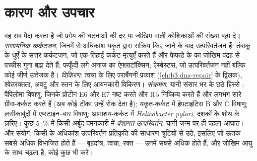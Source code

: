 \section{कारण और उपचार}

\begin{proposition}[कारण]\label{prop:b3:cancer-biology:causes}
 वह सब पैदा करता है जो प्रमेय की घटनाओं की दर या जोखिम वाली
कोशिकाओं की संख्या बढ़ा दे। \emph{रासायनिक कर्कटजन}, जिनमें से अधिकांश
यकृत द्वारा सक्रिय किए जाने के बाद उत्परिवर्तजन हैं: तंबाकू के धुएँ के
सत्तर कर्कटजन, जो एक-तिहाई कर्कट-मृत्युएँ करते हैं और फेफड़े के 
का जोखिम पंद्रह से पच्चीस गुना बढ़ा देते हैं; फफूँदी लगे अनाज का
ऐफ़्लाटॉक्सिन; ऐस्बेस्टस, जो उत्परिवर्तजन नहीं बल्कि कोई जीर्ण उत्तेजक
है। \emph{विकिरण}: त्वचा के लिए पराबैंगनी प्रकाश
(\cref{ch:b3:dna-repair} के द्विलक), श्वेतरक्तता, अवटु
और स्तन के लिए आयनकारी विकिरण। \emph{संक्रमण}, यानी संसार भर के छठे
हिस्से : पैपिलोमा विषाणु, जिनके प्रोटीन E6 और E7  नष्ट करते और
Rb निष्क्रिय करते हैं और लगभग सारे ग्रीवा-कर्कट करते हैं (अब कोई टीका
उन्हें रोक देता है); यकृत-कर्कट में हेपटाइटिस B और C विषाणु;
लसीकार्बुदों में एप्स्टाइन--बार विषाणु; आमाशय-कर्कट में
\emph{Helicobacter pylori}, दशकों के शोथ के ज़रिए। कुछ \qty{5}{\%}
 में किसी अर्बुद-दमनकारी में \emph{वंशागत उत्परिवर्तन}, यानी
जन्म पर ही पहला आघात। और संयोग: किसी  के अधिकांश उत्परिवर्तन
प्रतिकृति की साधारण त्रुटियों से उठे, इसलिए जो ऊतक सबसे अधिक विभाजित
होते हैं --- बृहदांत्र, त्वचा, रक्त --- उनमें सबसे अधिक  होते हैं,
और जोखिम आयु के साथ चढ़ता है, कोई कुछ भी करे।
\end{proposition}

